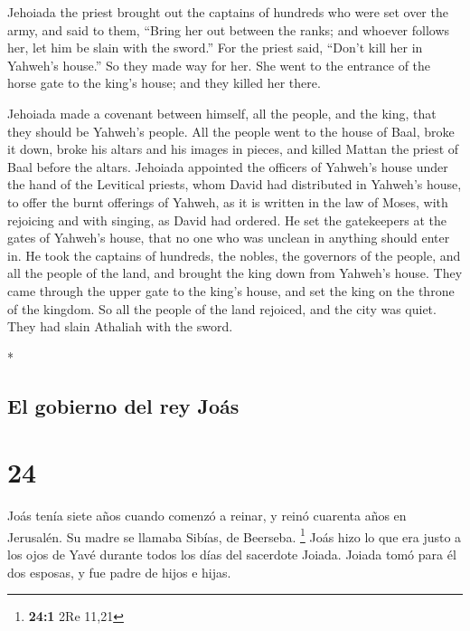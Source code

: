 \begin{paracol}{2}
\begin{otherlanguage}{english}
 Jehoiada the priest brought out the captains of hundreds
who were set over the army, and said to them, ``Bring her out between
the ranks; and whoever follows her, let him be slain with the sword.''
For the priest said, ``Don't kill her in Yahweh's house.''
 So they made way for her. She went to the entrance of
the horse gate to the king's house; and they killed her there.

 Jehoiada made a covenant between himself, all the
people, and the king, that they should be Yahweh's people.
 All the people went to the house of Baal, broke it down,
broke his altars and his images in pieces, and killed Mattan the priest
of Baal before the altars.  Jehoiada appointed the
officers of Yahweh's house under the hand of the Levitical priests, whom
David had distributed in Yahweh's house, to offer the burnt offerings of
Yahweh, as it is written in the law of Moses, with rejoicing and with
singing, as David had ordered.  He set the gatekeepers at
the gates of Yahweh's house, that no one who was unclean in anything
should enter in.  He took the captains of hundreds, the
nobles, the governors of the people, and all the people of the land, and
brought the king down from Yahweh's house. They came through the upper
gate to the king's house, and set the king on the throne of the kingdom.
 So all the people of the land rejoiced, and the city was
quiet. They had slain Athaliah with the sword.

\end{otherlanguage}

\switchcolumn[0]*

\hypertarget{el-gobierno-del-rey-jouxe1s}{%
\subsection{El gobierno del rey
Joás}\label{el-gobierno-del-rey-jouxe1s}}

\hypertarget{section-46}{%
\section{24}\label{section-46}}

 Joás tenía siete años cuando comenzó a reinar, y reinó
cuarenta años en Jerusalén. Su madre se llamaba Sibías, de Beerseba.
\footnote{\textbf{24:1} 2Re 11,21}  Joás hizo lo que era
justo a los ojos de Yavé durante todos los días del sacerdote Joiada.
 Joiada tomó para él dos esposas, y fue padre de hijos e
hijas.


\end{paracol}
